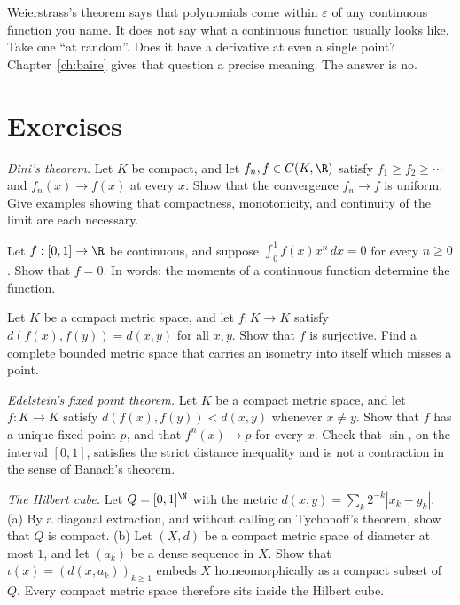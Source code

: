 Weierstrass's theorem says that polynomials come within $\varepsilon$ of any continuous function you name. It does not say what a continuous function usually looks like. Take one ``at random''. Does it have a derivative at even a single point? Chapter~\ref{ch:baire} gives that question a precise meaning. The answer is no.

\section{Exercises}

\begin{exercise}[$\star$]\label{ex:dini}
\emph{Dini's theorem.} Let $K$ be compact, and let $f_n,f\in C(K,\R)$ satisfy $f_1\ge f_2\ge\cdots$ and $f_n(x)\to f(x)$ at every $x$. Show that the convergence $f_n\to f$ is uniform. Give examples showing that compactness, monotonicity, and continuity of the limit are each necessary.
\end{exercise}

\begin{exercise}[$\star$]\label{ex:moments}
Let $f:[0,1]\to\R$ be continuous, and suppose $\int_0^1 f(x)x^n\,dx=0$ for every $n\ge0$. Show that $f=0$. In words: the moments of a continuous function determine the function.
\end{exercise}

\begin{exercise}[$\star\star$]\label{ex:isometry}
Let $K$ be a compact metric space, and let $f:K\to K$ satisfy $d(f(x),f(y))=d(x,y)$ for all $x,y$. Show that $f$ is surjective. Find a complete bounded metric space that carries an isometry into itself which misses a point.
\end{exercise}

\begin{exercise}[$\star\star$]\label{ex:edelstein}
\emph{Edelstein's fixed point theorem.} Let $K$ be a compact metric space, and let $f:K\to K$ satisfy $d(f(x),f(y))<d(x,y)$ whenever $x\ne y$. Show that $f$ has a unique fixed point $p$, and that $f^n(x)\to p$ for every $x$. Check that $\sin$, on the interval $[0,1]$, satisfies the strict distance inequality and is not a contraction in the sense of Banach's theorem.
\end{exercise}

\begin{exercise}[$\star\star$]\label{ex:hilbertcube}
\emph{The Hilbert cube.} Let $Q=[0,1]^\N$ with the metric $d(x,y)=\sum_k 2^{-k}|x_k-y_k|$. (a) By a diagonal extraction, and without calling on Tychonoff's theorem, show that $Q$ is compact. (b) Let $(X,d)$ be a compact metric space of diameter at most $1$, and let $(a_k)$ be a dense sequence in $X$. Show that $\iota(x)=(d(x,a_k))_{k\ge1}$ embeds $X$ homeomorphically as a compact subset of $Q$. Every compact metric space therefore sits inside the Hilbert cube.
\end{exercise}

